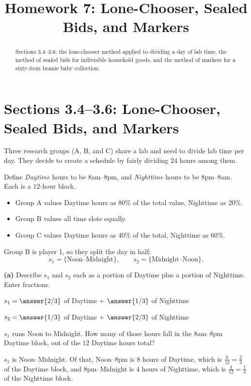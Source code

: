 \documentclass[12pt]{ximera}
\title{Homework 7: Lone-Chooser, Sealed Bids, and Markers}
\begin{document}
\begin{abstract}
Sections 3.4--3.6: the lone-chooser method applied to dividing a day of lab time, the
method of sealed bids for indivisible household goods, and the method of markers for a
sixty-item beanie baby collection.
\end{abstract}
\maketitle

\section*{Sections 3.4--3.6: Lone-Chooser, Sealed Bids, and Markers}

\begin{problem}
Three research groups (A, B, and C) share a lab and need to divide lab time per day.
They decide to create a schedule by fairly dividing $24$ hours among them.

Define \emph{Daytime} hours to be 8am--8pm, and \emph{Nighttime} hours to be
8pm--8am. Each is a $12$-hour block.
\begin{itemize}
\item Group A values Daytime hours as $80\%$ of the total value, Nighttime as $20\%$.
\item Group B values all time slots equally.
\item Group C values Daytime hours as $40\%$ of the total, Nighttime as $60\%$.
\end{itemize}

Group B is player 1, so they split the day in half:
\[ s_1 = \{\text{Noon--Midnight}\}, \qquad s_2 = \{\text{Midnight--Noon}\}. \]

\begin{prompt}
\textbf{(a)} Describe $s_1$ and $s_2$ each as a portion of Daytime plus a portion of
Nighttime. Enter fractions.

$s_1 = \answer{2/3}$ of Daytime $+$ $\answer{1/3}$ of Nighttime

\smallskip
$s_2 = \answer{1/3}$ of Daytime $+$ $\answer{2/3}$ of Nighttime

\begin{hint}
$s_1$ runs Noon to Midnight. How many of those hours fall in the 8am--8pm Daytime
block, out of the $12$ Daytime hours total?
\end{hint}

\begin{feedback}
$s_1$ is Noon--Midnight. Of that, Noon--8pm is $8$ hours of Daytime, which is
$\frac{8}{12}=\frac23$ of the Daytime block, and 8pm--Midnight is $4$ hours of
Nighttime, which is $\frac{4}{12}=\frac13$ of the Nighttime block.


\end{feedback}
\end{prompt}
\end{problem}
\end{document}
